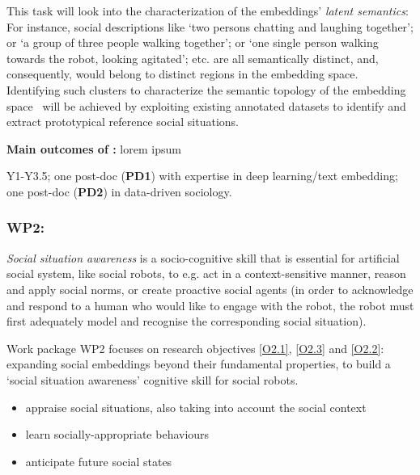 This task will look into the characterization of the embeddings' \emph{latent
semantics}: For instance, social descriptions like `two persons chatting and
laughing together'; or `a group of three people walking together'; or `one
single person walking towards the robot, looking agitated'; etc.  are all
semantically distinct, and, consequently, would belong to distinct regions in
the embedding space. Identifying such clusters to characterize the semantic
topology of the embedding space~\cite{sun2023topological} will be achieved by
exploiting existing annotated datasets to identify and extract prototypical
reference social situations.

\begin{framed}
    {\noindent\bf Main outcomes of \tAD:} lorem ipsum 
\end{framed}


\begin{framed}
     Y1-Y3.5; one post-doc ({\bf PD1}) with expertise in
    deep learning/text embedding; one post-doc ({\bf PD2}) in data-driven
    sociology.
\end{framed}

\subsubsection{WP2: \textbf{\WPB}}

\emph{Social situation awareness} is a socio-cognitive skill that is essential for
artificial social system, like social robots, to e.g.  act in a
context-sensitive manner, reason and apply social norms, or create proactive
social agents (in order to acknowledge and respond to a human who would like
to engage with the robot, the robot must first adequately model and
recognise the corresponding social situation).

Work package WP2 focuses on research objectives \ref{O2.1}, \ref{O2.3} and \ref{O2.2}:
expanding social embeddings beyond their fundamental properties, to build a
`social situation awareness' cognitive skill for social robots.

\begin{itemize}
    \item appraise social situations, also taking into account the social context
    \item learn socially-appropriate behaviours
    \item anticipate future social states
\end{itemize}



